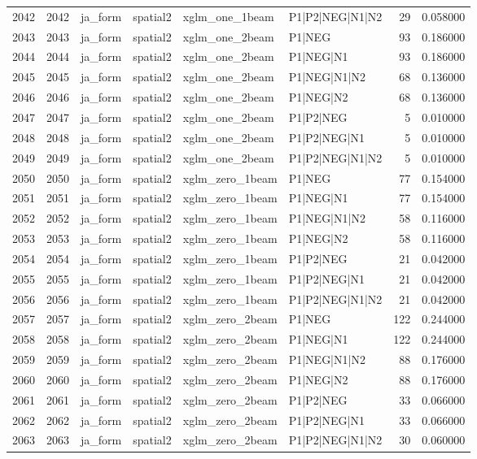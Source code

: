 \begin{tabular}{lrllllrr}
2042 & 2042 & ja_form & spatial2 & xglm_one_1beam & P1|P2|NEG|N1|N2 & 29 & 0.058000 \\
2043 & 2043 & ja_form & spatial2 & xglm_one_2beam & P1|NEG & 93 & 0.186000 \\
2044 & 2044 & ja_form & spatial2 & xglm_one_2beam & P1|NEG|N1 & 93 & 0.186000 \\
2045 & 2045 & ja_form & spatial2 & xglm_one_2beam & P1|NEG|N1|N2 & 68 & 0.136000 \\
2046 & 2046 & ja_form & spatial2 & xglm_one_2beam & P1|NEG|N2 & 68 & 0.136000 \\
2047 & 2047 & ja_form & spatial2 & xglm_one_2beam & P1|P2|NEG & 5 & 0.010000 \\
2048 & 2048 & ja_form & spatial2 & xglm_one_2beam & P1|P2|NEG|N1 & 5 & 0.010000 \\
2049 & 2049 & ja_form & spatial2 & xglm_one_2beam & P1|P2|NEG|N1|N2 & 5 & 0.010000 \\
2050 & 2050 & ja_form & spatial2 & xglm_zero_1beam & P1|NEG & 77 & 0.154000 \\
2051 & 2051 & ja_form & spatial2 & xglm_zero_1beam & P1|NEG|N1 & 77 & 0.154000 \\
2052 & 2052 & ja_form & spatial2 & xglm_zero_1beam & P1|NEG|N1|N2 & 58 & 0.116000 \\
2053 & 2053 & ja_form & spatial2 & xglm_zero_1beam & P1|NEG|N2 & 58 & 0.116000 \\
2054 & 2054 & ja_form & spatial2 & xglm_zero_1beam & P1|P2|NEG & 21 & 0.042000 \\
2055 & 2055 & ja_form & spatial2 & xglm_zero_1beam & P1|P2|NEG|N1 & 21 & 0.042000 \\
2056 & 2056 & ja_form & spatial2 & xglm_zero_1beam & P1|P2|NEG|N1|N2 & 21 & 0.042000 \\
2057 & 2057 & ja_form & spatial2 & xglm_zero_2beam & P1|NEG & 122 & 0.244000 \\
2058 & 2058 & ja_form & spatial2 & xglm_zero_2beam & P1|NEG|N1 & 122 & 0.244000 \\
2059 & 2059 & ja_form & spatial2 & xglm_zero_2beam & P1|NEG|N1|N2 & 88 & 0.176000 \\
2060 & 2060 & ja_form & spatial2 & xglm_zero_2beam & P1|NEG|N2 & 88 & 0.176000 \\
2061 & 2061 & ja_form & spatial2 & xglm_zero_2beam & P1|P2|NEG & 33 & 0.066000 \\
2062 & 2062 & ja_form & spatial2 & xglm_zero_2beam & P1|P2|NEG|N1 & 33 & 0.066000 \\
2063 & 2063 & ja_form & spatial2 & xglm_zero_2beam & P1|P2|NEG|N1|N2 & 30 & 0.060000 \\

\end{tabular}
